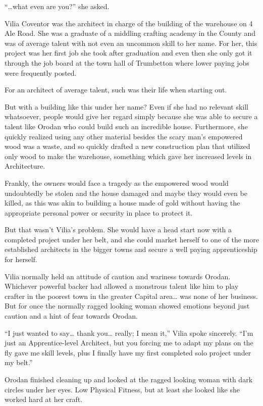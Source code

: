 \documentclass[a4paper,10pt]{book}
\begin{document}
“…what even are you?” she asked.\par
Vilia Coventor was the architect in charge of the building of the warehouse on 4 Ale Road. She was a graduate of a middling crafting academy in the County and was of average talent with not even an uncommon skill to her name. For her, this project was her first job she took after graduation and even then she only got it through the job board at the town hall of Trumbetton where lower paying jobs were frequently posted.\par
For an architect of average talent, such was their life when starting out.\par
But with a building like this under her name? Even if she had no relevant skill whatsoever, people would give her regard simply because she was able to secure a talent like Orodan who could build such an incredible house. Furthermore, she quickly realized using any other material besides the scary man’s empowered wood was a waste, and so quickly drafted a new construction plan that utilized only wood to make the warehouse, something which gave her increased levels in Architecture.\par
Frankly, the owners would face a tragedy as the empowered wood would undoubtedly be stolen and the house damaged and maybe they would even be killed, as this was akin to building a house made of gold without having the appropriate personal power or security in place to protect it.\par
But that wasn’t Vilia’s problem. She would have a head start now with a completed project under her belt, and she could market herself to one of the more established architects in the bigger towns and secure a well paying apprenticeship for herself.\par
Vilia normally held an attitude of caution and wariness towards Orodan. Whichever powerful backer had allowed a monstrous talent like him to play crafter in the poorest town in the greater Capital area… was none of her business. But for once the normally ragged looking woman showed emotions beyond just caution and a hint of fear towards Orodan.\par
“I just wanted to say… thank you… really; I mean it,” Vilia spoke sincerely. “I’m just an Apprentice-level Architect, but you forcing me to adapt my plans on the fly gave me skill levels, plus I finally have my first completed solo project under my belt.”\par
Orodan finished cleaning up and looked at the ragged looking woman with dark circles under her eyes. Low Physical Fitness, but at least she looked like she worked hard at her craft.\par
\end{document}
